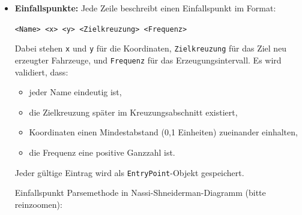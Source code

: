 \begin{itemize}
  \item \textbf{Einfallspunkte:} Jede Zeile beschreibt einen Einfallspunkt im Format:
  \begin{center}
    \texttt{<Name> <x> <y> <Zielkreuzung> <Frequenz>}
  \end{center}
  Dabei stehen \texttt{x} und \texttt{y} für die Koordinaten, \texttt{Zielkreuzung} für das Ziel neu erzeugter Fahrzeuge,
  und \texttt{Frequenz} für das Erzeugungsintervall.
  Es wird validiert, dass:
  \begin{itemize}
    \item jeder Name eindeutig ist,
    \item die Zielkreuzung später im Kreuzungsabschnitt existiert,
    \item Koordinaten einen Mindestabstand (0{,}1 Einheiten) zueinander einhalten,
    \item die Frequenz eine positive Ganzzahl ist.
  \end{itemize}
  Jeder gültige Eintrag wird als \texttt{EntryPoint}-Objekt gespeichert.

  Einfallspunkt Parsemethode in Nassi-Shneiderman-Diagramm (bitte reinzoomen):
  \vspace{-1.5cm} 
  \FloatBarrier
  \begin{figure}[h!]
    \vspace{-1.5cm} 
    \centering
\end{figure}


\end{itemize}
